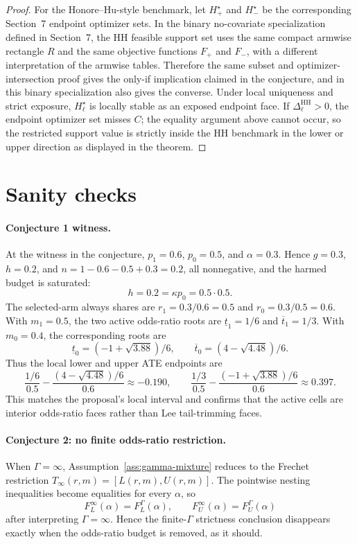 \documentclass[11pt]{article}
\theoremstyle{definition}
\theoremstyle{plain}
\theoremstyle{remark}
\begin{document}
\begin{proof}
For the Honore--Hu-style benchmark, let \(H_+^\star\) and \(H_-^\star\) be the
corresponding Section~7 endpoint optimizer sets.  In the binary no-covariate
specialization defined in Section~7, the HH feasible support set uses the same
compact armwise rectangle \(R\) and the same objective functions \(F_+\) and
\(F_-\), with a different interpretation of the armwise tables.  Therefore the
same subset and optimizer-intersection proof gives the only-if implication
claimed in the conjecture, and in this binary specialization also gives the
converse.  Under local uniqueness and strict exposure, \(H_\ell^\star\) is
locally stable as an exposed endpoint face.  If \(\Delta_\ell^{\mathrm{HH}}>0\),
the endpoint optimizer set misses \(C\); the equality argument above cannot
occur, so the restricted support value is strictly inside the HH benchmark in
the lower or upper direction as displayed in the theorem.
\end{proof}

\section{Sanity checks}
\paragraph{Conjecture 1 witness.}
At the witness in the conjecture, \(p_1=0.6\), \(p_0=0.5\), and
\(\alpha=0.3\).  Hence \(g=0.3\), \(h=0.2\), and
\(n=1-0.6-0.5+0.3=0.2\), all nonnegative, and the harmed budget is saturated:
\[
  h=0.2=\kappa p_0=0.5\cdot 0.5 .
\]
The selected-arm always shares are \(r_1=0.3/0.6=0.5\) and
\(r_0=0.3/0.5=0.6\).  With \(m_1=0.5\), the two active odds-ratio roots are
\(\underline t_1=1/6\) and \(\overline t_1=1/3\).  With \(m_0=0.4\), the
corresponding roots are
\[
  \underline t_0=(-1+\sqrt{3.88})/6,\qquad
  \overline t_0=(4-\sqrt{4.48})/6 .
\]
Thus the local lower and upper ATE endpoints are
\[
  \frac{1/6}{0.5}-\frac{(4-\sqrt{4.48})/6}{0.6}
  \approx -0.190,
  \qquad
  \frac{1/3}{0.5}-\frac{(-1+\sqrt{3.88})/6}{0.6}
  \approx 0.397 .
\]
This matches the proposal's local interval and confirms that the active cells
are interior odds-ratio faces rather than Lee tail-trimming faces.

\paragraph{Conjecture 2: no finite odds-ratio restriction.}
When \(\Gamma=\infty\), Assumption~\ref{ass:gamma-mixture} reduces to the
Frechet restriction \(T_\infty(r,m)=[L(r,m),U(r,m)]\).  The pointwise nesting
inequalities become equalities for every \(\alpha\), so
\[
  F_L^\infty(\alpha)=F_L^\Gamma(\alpha),
  \qquad
  F_U^\infty(\alpha)=F_U^\Gamma(\alpha)
\]
after interpreting \(\Gamma=\infty\).  Hence the finite-\(\Gamma\) strictness
conclusion disappears exactly when the odds-ratio budget is removed, as it
should.
\end{document}
